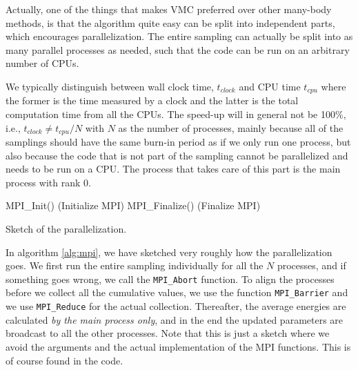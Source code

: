 Actually, one of the things that makes VMC preferred over other many-body methods, is that the algorithm quite easy can be split into independent parts, which encourages parallelization. The entire sampling can actually be split into as many parallel processes as needed, such that the code can be run on an arbitrary number of CPUs. 

We typically distinguish between wall clock time, $t_{clock}$ and CPU time $t_{cpu}$ where the former is the time measured by a clock and the latter is the total computation time from all the CPUs. The speed-up will in general not be 100\%, i.e., $t_{clock}\neq t_{cpu}/N$ with $N$ as the number of processes, mainly because all of the samplings should have the same burn-in period as if we only run one process, but also because the code that is not part of the sampling cannot be parallelized and needs to be run on a CPU. The process that takes care of this part is the main process with rank 0.

\IncMargin{1em}
\begin{algorithm}
	\SetAlgoLined
	MPI\_Init() (Initialize MPI)\;
	MPI\_Finalize() (Finalize MPI)\;
	\caption{Sketch of the parallelization.}
	\label{alg:mpi}
\end{algorithm}\DecMargin{1em}

In algorithm \ref{alg:mpi}, we have sketched very roughly how the parallelization goes. We first run the entire sampling individually for all the $N$ processes, and if something goes wrong, we call the \lstinline|MPI_Abort| function. To align the processes before we collect all the cumulative values, we use the function \lstinline|MPI_Barrier| and we use \lstinline|MPI_Reduce| for the actual collection. Thereafter, the average energies are calculated \textit{by the main process only}, and in the end the updated parameters are broadcast to all the other processes. Note that this is just a sketch where we avoid the arguments and the actual implementation of the MPI functions. This is of course found in the code. 

